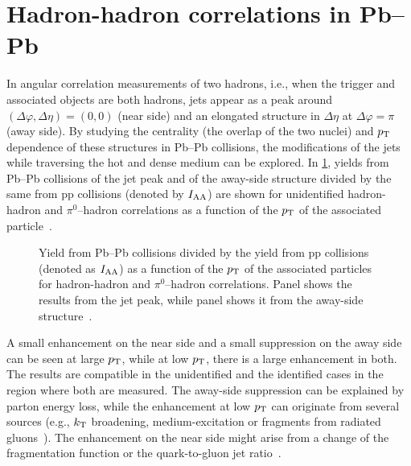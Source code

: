\documentclass{PoS}
\begin{document}
\section{Hadron-hadron correlations in Pb--Pb}
In angular correlation measurements of two hadrons, i.e., when the trigger and associated objects are both hadrons, jets appear as a peak around $(\Delta\varphi,\Delta\eta) = (0,0)$ (near side) and an elongated structure in $\Delta\eta$ at $\Delta\varphi=\pi$ (away side). By studying the centrality (the overlap of the two nuclei) and $p_{\rm T}$ dependence of these structures in Pb--Pb collisions, the modifications of the jets while traversing the hot and dense medium can be explored. In \cref{fig:yieldPbPb}, yields from Pb--Pb collisions of the jet peak and of the away-side structure divided by the same from pp collisions (denoted by $I_{\rm AA}$) are shown for unidentified hadron-hadron and $\pi^0$--hadron correlations as a function of the $p_{\rm T}$ of the associated particle~\cite{Adam:2016xbp}.
\begin{figure}[!bp]
  \caption{Yield from Pb--Pb collisions divided by the yield from pp collisions (denoted as $I_{\rm AA}$) as a function of the $p_{\rm T}$ of the associated particles for hadron-hadron and $\pi^0$--hadron correlations. Panel \protect{} shows the results from the jet peak, while panel \protect{} shows it from the away-side structure~\cite{Adam:2016xbp}.}
  \label{fig:yieldPbPb}
\end{figure}
 A small enhancement on the near side and a small suppression on the away side can be seen at large $p_{\rm T}$, while at low $p_{\rm T}$, there is a large enhancement in both. The results are compatible in the unidentified and the identified cases in the region where both are measured. The away-side suppression can be explained by parton energy loss, while the enhancement at low $p_{\rm T}$ can originate from several sources (e.g., $k_{\rm T}$ broadening, medium-excitation or fragments from radiated gluons~\cite{Vitev,Ma,Wang,Kopeliovich,Gyulassy}). The enhancement on the near side might arise from a change of the fragmentation function or the quark-to-gluon jet ratio~\cite{Aamodt}.
\end{document}

